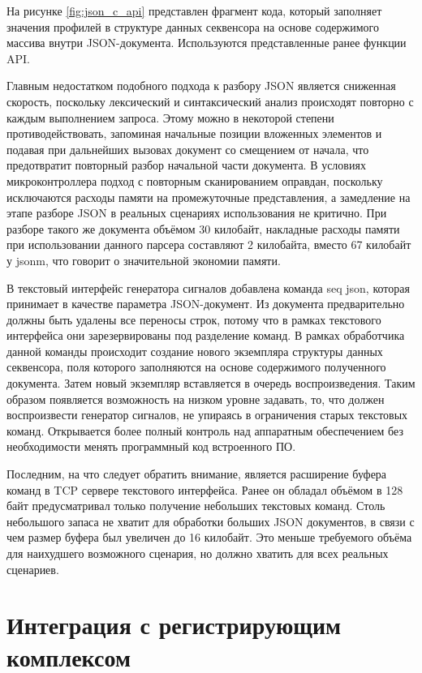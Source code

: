 \documentclass{report}
\begin{document}
На рисунке \ref{fig:json_c_api} представлен фрагмент кода, который заполняет значения профилей в структуре данных секвенсора на основе содержимого массива внутри JSON-документа. Используются представленные ранее функции API.


Главным недостатком подобного подхода к разбору JSON является сниженная скорость, поскольку лексический и синтаксический анализ происходят повторно с каждым выполнением запроса. Этому можно в некоторой степени противодействовать, запоминая начальные позиции вложенных элементов и подавая при дальнейших вызовах документ со смещением от начала, что предотвратит повторный разбор начальной части документа. В условиях микроконтроллера подход с повторным сканированием оправдан, поскольку исключаются расходы памяти на промежуточные представления, а замедление на этапе разборе JSON в реальных сценариях использования не критично. При разборе такого же документа объёмом 30 килобайт, накладные расходы памяти при использовании данного парсера составляют 2 килобайта, вместо 67 килобайт у jsonm, что говорит о значительной экономии памяти.

В текстовый интерфейс генератора сигналов добавлена команда seq json, которая принимает в качестве параметра JSON-документ. Из документа предварительно должны быть удалены все переносы строк, потому что в рамках текстового интерфейса они зарезервированы под разделение команд. В рамках обработчика данной команды происходит создание нового экземпляра структуры данных секвенсора, поля которого заполняются на основе содержимого полученного документа. Затем новый экземпляр вставляется в очередь воспроизведения. Таким образом появляется возможность на низком уровне задавать, то, что должен воспроизвести генератор сигналов, не упираясь в ограничения старых текстовых команд. Открывается более полный контроль над аппаратным обеспечением без необходимости менять программный код встроенного ПО.

Последним, на что следует обратить внимание, является расширение буфера команд в TCP сервере текстового интерфейса. Ранее он обладал объёмом в 128 байт предусматривал только получение небольших текстовых команд. Столь небольшого запаса не хватит для обработки больших JSON документов, в связи с чем размер буфера был увеличен до 16 килобайт. Это меньше требуемого объёма для наихудшего возможного сценария, но должно хватить для всех реальных сценариев.

\section{Интеграция с регистрирующим комплексом}
\end{document}
